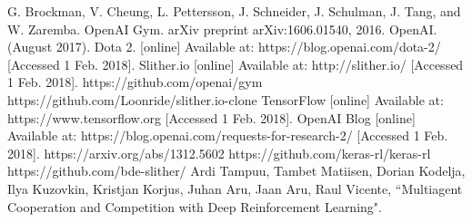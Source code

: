 \documentclass[conference,10pt]{IEEEtran}
\begin{document}
\begin{thebibliography}{00}
 G. Brockman, V. Cheung, L. Pettersson, J. Schneider, J. Schulman, J. Tang, and W. Zaremba. OpenAI Gym. arXiv preprint arXiv:1606.01540, 2016.
 OpenAI. (August 2017). Dota 2. [online] Available at: https://blog.openai.com/dota-2/ [Accessed 1 Feb. 2018].
 Slither.io [online] Available at: http://slither.io/ [Accessed 1 Feb. 2018].
https://github.com/openai/gym
https://github.com/Loonride/slither.io-clone
 TensorFlow [online] Available at: https://www.tensorflow.org [Accessed 1 Feb. 2018].
 OpenAI Blog [online] Available at: https://blog.openai.com/requests-for-research-2/ [Accessed 1 Feb. 2018].
https://arxiv.org/abs/1312.5602
https://github.com/keras-rl/keras-rl
https://github.com/bde-slither/
Ardi Tampuu, Tambet Matiisen, Dorian Kodelja, Ilya Kuzovkin, Kristjan Korjus, Juhan Aru, Jaan Aru, Raul Vicente, ``Multiagent Cooperation and Competition with Deep Reinforcement Learning".

\end{thebibliography}
\end{document}
